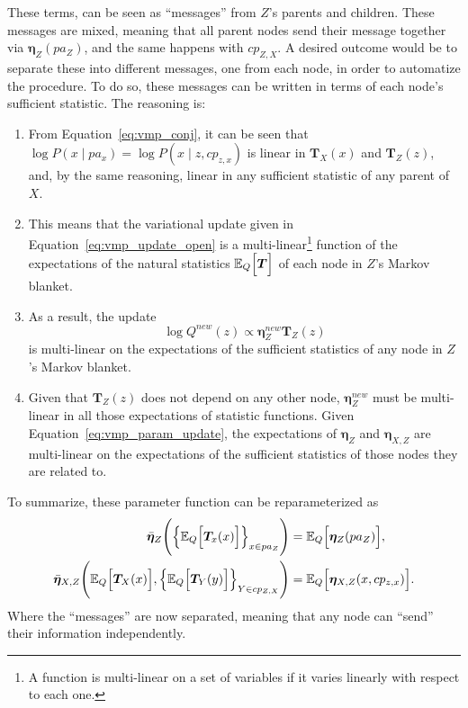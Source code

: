  These terms, can be seen as ``messages'' from \(Z\)'s parents and children. These messages are mixed, meaning that all parent nodes send their message together via \(\bm{\eta}_{Z}(pa_{Z})\), and the same happens with \(cp_{Z,X}\). A desired outcome would be to separate these into different messages, one from each node, in order to automatize the procedure. To do so, these messages can be written in terms of each node's sufficient statistic. The reasoning is:
 \begin{enumerate}
   \item From Equation~\ref{eq:vmp_conj}, it can be seen that \( \log P(x \mid pa_{x}) = \log P(x \mid z , cp_{z,x}) \) is linear in \( \bm{T}_X(x) \) and \( \bm{T}_Z(z) \), and, by the same reasoning, linear in any sufficient statistic of any parent of \( X \).
   \item This means that the variational update given in Equation~\ref{eq:vmp_update_open} is a multi-linear\footnote{A function is multi-linear on a set of variables if it varies linearly with respect to each one.} function of the expectations of the natural statistics \(\mathbb{E}_{Q}\Big[\bm{T}\Big]\) of each node in \(Z\)'s Markov blanket.
   \item As a result, the update
     \[
     \log Q^{new}(z) \propto \bm{\eta}^{new}_{Z} \bm{T}_{Z}(z)
     \]
     is multi-linear on the expectations of the sufficient statistics of any node in \(Z\)'s Markov blanket.
   \item Given that \(\bm{T}_{Z}(z)\) does not depend on any other node, \(\bm{\eta}^{new}_{Z}\) must be multi-linear in all those expectations of statistic functions. Given Equation~\ref{eq:vmp_param_update}, the expectations of \( \bm{\eta}_Z \) and \( \bm{\eta}_{X, Z} \) are multi-linear on the expectations of the sufficient statistics of those nodes they are related to.
 \end{enumerate}
To summarize, these parameter function can be reparameterized as
\[
  \begin{aligned}
    \bar{\bm{\eta}}_Z \Bigg(\Big\{ \mathbb{E}_{Q}\Big[\bm{T}_{x}(x)\Big] \Big\}_{x \in pa_Z} \Bigg) &= \mathbb{E}_{Q}\Big[\bm{\eta}_Z(pa_Z)\Big],\\
    \bar{\bm{\eta}}_{X,Z} \Bigg(  \mathbb{E}_{Q}\Big[\bm{T}_{X}(x)\Big], \Big\{ \mathbb{E}_{Q}\Big[\bm{T}_{Y}(y)\Big] \Big\}_{Y \in cp_{Z,X}}\Bigg) &= \mathbb{E}_{Q}\Big[\bm{\eta}_{X, Z}(x, cp_{z,x})\Big].\\
  \end{aligned}
\]
Where the ``messages'' are now separated, meaning that any node can ``send'' their information independently.

